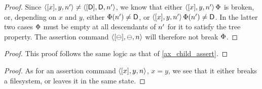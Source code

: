 \begin{myaxproof}
\axaxchildassert
\end{myaxproof}

\begin{proof}
Since $\langle{[x],y,n'}\rangle\neq\langle{[\mathsf{D}],\mathsf{D},n'}\rangle$, we know that
either $\langle{[x],y,n'}\rangle\,\Phi$ is broken, or, depending on $x$ and $y$,
either $\Phi(n')\neq\mathsf{D}$, or $\langle{[x],y,n'}\rangle\,\Phi(n')\neq\mathsf{D}$.
In the latter two cases $\Phi$ must be empty at all descendants of $n'$
for it to satisfy the tree property.
The assertion command $\langle{[\ominus],\ominus,n}\rangle$ will therefore not break $\Phi$.
\end{proof}

\begin{myaxproof}
\axaxparentassert
\end{myaxproof}

\begin{proof}
This proof follows the same logic as that of \cref{ax_child_assert}.
\end{proof}

\begin{myaxproof}
\axaxassert
\end{myaxproof}

\begin{proof}
As for an assertion command $\langle{[x],y,n}\rangle$, $x=y$, we see that it either
breaks a filesystem, or leaves it in the same state.
\end{proof}
